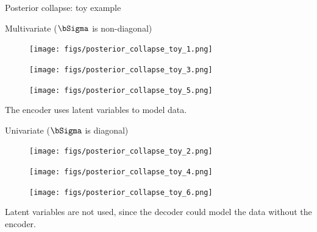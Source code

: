 \begin{frame}{Posterior collapse: toy example}
	\begin{block}{Multivariate ($\bSigma$ is non-diagonal)}
		\vspace{-0.5cm}
		\begin{minipage}[t]{0.33\columnwidth}
			\begin{figure}[h]
				\centering
				\texttt{[image: figs/posterior\_collapse\_toy\_1.png]}
			\end{figure}
		\end{minipage}%
		\begin{minipage}[t]{0.33\columnwidth}
			\begin{figure}[h]
				\centering
				\texttt{[image: figs/posterior\_collapse\_toy\_3.png]}
			\end{figure}
		\end{minipage}%
		\begin{minipage}[t]{0.33\columnwidth}
			\begin{figure}[h]
				\centering
				\texttt{[image: figs/posterior\_collapse\_toy\_5.png]}
			\end{figure}
		\end{minipage}
	The encoder uses latent variables to model data.
	\end{block}

	\begin{block}{Univariate ($\bSigma$ is diagonal)}
		\vspace{-0.5cm}
		\begin{minipage}[t]{0.33\columnwidth}
		\begin{figure}[h]
			\centering
			\texttt{[image: figs/posterior\_collapse\_toy\_2.png]}
		\end{figure}
		\end{minipage}%
		\begin{minipage}[t]{0.33\columnwidth}
		\begin{figure}[h]
			\centering
			\texttt{[image: figs/posterior\_collapse\_toy\_4.png]}
		\end{figure}
		\end{minipage}%
		\begin{minipage}[t]{0.33\columnwidth}
		\begin{figure}[h]
			\centering
			\texttt{[image: figs/posterior\_collapse\_toy\_6.png]}
		\end{figure}
		\end{minipage}
	Latent variables are not used, since the decoder could model the data without the encoder.
	\end{block}
\end{frame}
